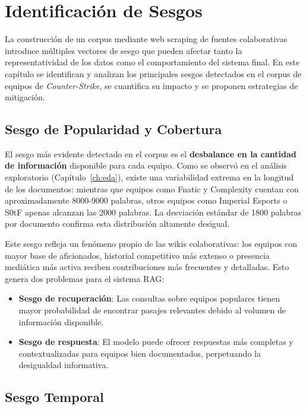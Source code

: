 ﻿\chapter{Identificación de Sesgos}
\label{ch:sesgos}

La construcción de un corpus mediante web scraping de fuentes colaborativas introduce múltiples vectores de sesgo que pueden afectar tanto la representatividad de los datos como el comportamiento del sistema final. En este capítulo se identifican y analizan los principales sesgos detectados en el corpus de equipos de \textit{Counter-Strike}, se cuantifica su impacto y se proponen estrategias de mitigación.


\section{Sesgo de Popularidad y Cobertura}

El sesgo más evidente detectado en el corpus es el \textbf{desbalance en la cantidad de información} disponible para cada equipo. Como se observó en el análisis exploratorio (Capítulo~\ref{ch:eda}), existe una variabilidad extrema en la longitud de los documentos: mientras que equipos como Fnatic y Complexity cuentan con aproximadamente 8000-9000 palabras, otros equipos como Imperial Esports o S0tF apenas alcanzan las 2000 palabras. La desviación estándar de 1800 palabras por documento confirma esta distribución altamente desigual.

Este sesgo refleja un fenómeno propio de las wikis colaborativas: los equipos con mayor base de aficionados, historial competitivo más extenso o presencia mediática más activa reciben contribuciones más frecuentes y detalladas. Esto genera dos problemas para el sistema RAG:

\begin{itemize}
    \item \textbf{Sesgo de recuperación}: Las consultas sobre equipos populares tienen mayor probabilidad de encontrar pasajes relevantes debido al volumen de información disponible.
    \item \textbf{Sesgo de respuesta}: El modelo puede ofrecer respuestas más completas y contextualizadas para equipos bien documentados, perpetuando la desigualdad informativa.
\end{itemize}


\section{Sesgo Temporal}

